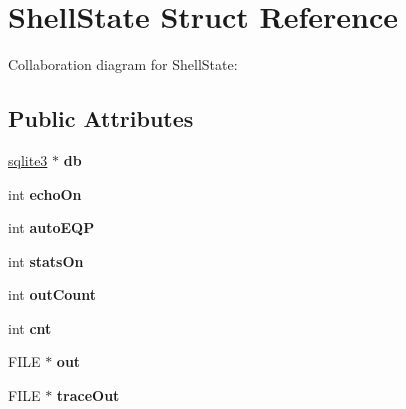 \hypertarget{struct_shell_state}{\section{Shell\+State Struct Reference}
\label{struct_shell_state}
}


Collaboration diagram for Shell\+State\+:
\subsection*{Public Attributes}
\begin{DoxyCompactItemize}
\item 
\hypertarget{struct_shell_state_aff5184c68cc62f6db1876cc28ffaf7e0}{\hyperlink{structsqlite3}{sqlite3} $\ast$ {\bfseries db}}\label{struct_shell_state_aff5184c68cc62f6db1876cc28ffaf7e0}

\item 
\hypertarget{struct_shell_state_a1df59448f712867b5acc5427fb929534}{int {\bfseries echo\+On}}\label{struct_shell_state_a1df59448f712867b5acc5427fb929534}

\item 
\hypertarget{struct_shell_state_ab3a2de04a6ec0c08da36f5b2a8870df0}{int {\bfseries auto\+E\+Q\+P}}\label{struct_shell_state_ab3a2de04a6ec0c08da36f5b2a8870df0}

\item 
\hypertarget{struct_shell_state_a07631569595d0bac838efef39e6e147d}{int {\bfseries stats\+On}}\label{struct_shell_state_a07631569595d0bac838efef39e6e147d}

\item 
\hypertarget{struct_shell_state_aa3830a7924f73f6ff4eb27fd11ef4a14}{int {\bfseries out\+Count}}\label{struct_shell_state_aa3830a7924f73f6ff4eb27fd11ef4a14}

\item 
\hypertarget{struct_shell_state_a2ff4d941ad9ef12844aa5281e98ef7c1}{int {\bfseries cnt}}\label{struct_shell_state_a2ff4d941ad9ef12844aa5281e98ef7c1}

\item 
\hypertarget{struct_shell_state_afe68611d577c5398d24a790bac1b5e56}{F\+I\+L\+E $\ast$ {\bfseries out}}\label{struct_shell_state_afe68611d577c5398d24a790bac1b5e56}

\item 
\hypertarget{struct_shell_state_a308c221cb2f11f68231232a18466c94f}{F\+I\+L\+E $\ast$ {\bfseries trace\+Out}}\label{struct_shell_state_a308c221cb2f11f68231232a18466c94f}


\end{DoxyCompactItemize}
